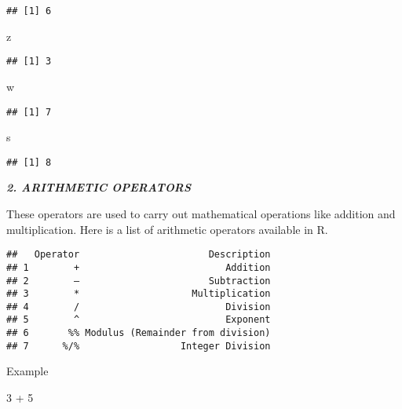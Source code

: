 \documentclass[
]{article}
\newenvironment{Shaded}{\begin{snugshade}}{\end{snugshade}}
\newcommand{\DecValTok}[1]{\textcolor[rgb]{0.00,0.00,0.81}{#1}}
\newcommand{\NormalTok}[1]{#1}
\newcommand{\SpecialCharTok}[1]{\textcolor[rgb]{0.00,0.00,0.00}{#1}}
\begin{document}
\begin{verbatim}
## [1] 6
\end{verbatim}

\begin{Shaded}
\begin{Highlighting}[]
\NormalTok{z}
\end{Highlighting}
\end{Shaded}

\begin{verbatim}
## [1] 3
\end{verbatim}

\begin{Shaded}
\begin{Highlighting}[]
\NormalTok{w}
\end{Highlighting}
\end{Shaded}

\begin{verbatim}
## [1] 7
\end{verbatim}

\begin{Shaded}
\begin{Highlighting}[]
\NormalTok{s}
\end{Highlighting}
\end{Shaded}

\begin{verbatim}
## [1] 8
\end{verbatim}

\textbf{\emph{2. ARITHMETIC OPERATORS}}

These operators are used to carry out mathematical operations like
addition and multiplication. Here is a list of arithmetic operators
available in R.

\begin{verbatim}
##   Operator                       Description
## 1        +                          Addition
## 2        –                       Subtraction
## 3        *                    Multiplication
## 4        /                          Division
## 5        ^                          Exponent
## 6       %% Modulus (Remainder from division)
## 7      %/%                  Integer Division
\end{verbatim}

Example

\begin{Shaded}
\begin{Highlighting}[]
\DecValTok{3} \SpecialCharTok{+} \DecValTok{5}   
\end{Highlighting}
\end{Shaded}
\end{document}
